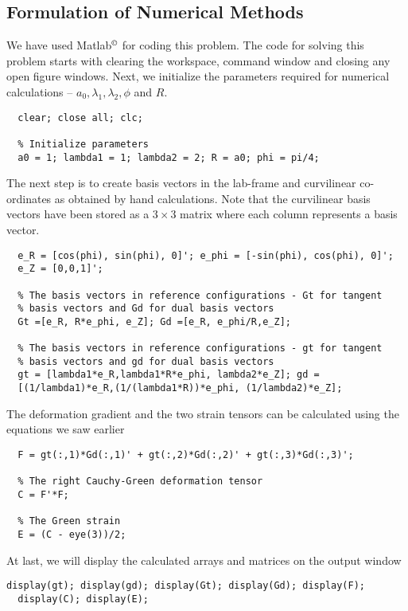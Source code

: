 \documentclass[../main.tex]{subfiles}
\begin{document}
\subsection{Formulation of Numerical Methods}
We have used Matlab$^\copyright$ for coding this problem. The code for
solving this problem starts with clearing the workspace, command
window and closing any open figure windows. Next, we initialize the
parameters required for numerical calculations --
$a_0,\lambda_1,\lambda_2,\phi$ and $R$.
\begin{lstlisting}[style=Matlab-editor]
  % Clean the set-up
  clear; close all; clc;
  
  % Initialize parameters
  a0 = 1; lambda1 = 1; lambda2 = 2; R = a0; phi = pi/4;
\end{lstlisting}
The next step is to create basis vectors in the lab-frame and
curvilinear co-ordinates as obtained by hand calculations. Note that
the curvilinear basis vectors have been stored as a $3\times3$ matrix
where each column represents a basis vector.
\begin{lstlisting}[style=Matlab-editor]
  % The cylindrical basis vectors
  e_R = [cos(phi), sin(phi), 0]'; e_phi = [-sin(phi), cos(phi), 0]';
  e_Z = [0,0,1]';
  
  % The basis vectors in reference configurations - Gt for tangent
  % basis vectors and Gd for dual basis vectors
  Gt =[e_R, R*e_phi, e_Z]; Gd =[e_R, e_phi/R,e_Z];
  
  % The basis vectors in reference configurations - gt for tangent
  % basis vectors and gd for dual basis vectors
  gt = [lambda1*e_R,lambda1*R*e_phi, lambda2*e_Z]; gd =
  [(1/lambda1)*e_R,(1/(lambda1*R))*e_phi, (1/lambda2)*e_Z];
\end{lstlisting}

The deformation gradient and the two strain tensors can be calculated
using the equations we saw earlier
\begin{lstlisting}[style=Matlab-editor]
  % Deformation Gradient, $ F = gt(:,i) \otimes Gd(:,i) $
  F = gt(:,1)*Gd(:,1)' + gt(:,2)*Gd(:,2)' + gt(:,3)*Gd(:,3)';
  
  % The right Cauchy-Green deformation tensor
  C = F'*F;
  
  % The Green strain
  E = (C - eye(3))/2;
\end{lstlisting}
At last, we will display the calculated arrays and matrices on the
output window
\begin{lstlisting}[style=Matlab-editor]
  display(gt); display(gd); display(Gt); display(Gd); display(F);
  display(C); display(E);
\end{lstlisting}
\end{document}
